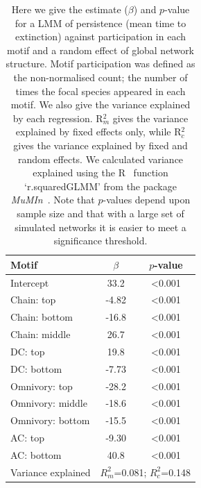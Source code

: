 \documentclass[12pt]{article}
\begin{document}
		\begin{table}[hb!]
    		\caption{Here we give the estimate ($\beta$) and $p$-value for a LMM of persistence (mean time to extinction) against participation in each motif and a random effect of global network structure. Motif participation was defined as the non-normalised count; the number of times the focal species appeared in each motif. We also give the variance explained by each regression. R$^{2}_{m}$ gives the variance explained by fixed effects only, while R$^{2}_{c}$ gives the variance explained by fixed and random effects. We calculated variance explained using the R~\citep{R} function `r.squaredGLMM' from the package \emph{MuMIn}~\citep{MuMIn}. Note that $p$-values depend upon sample size and that with a large set of simulated networks it is easier to meet a significance threshold.}
    		\label{tab:freq_positions}
    		\begin{tabular}{l | c c}
    		Motif & $\beta$ & $p$-value \\  
    		\hline
            Intercept	&	33.2	&	\textless0.001	\\
            Chain: top	&	-4.82	&	\textless0.001	\\
            Chain: bottom	&	-16.8	&	\textless0.001	\\
            Chain: middle	&	26.7	&	\textless0.001	\\
            DC: top	&	19.8	&	\textless0.001	\\
            DC: bottom	&	-7.73	&	\textless0.001	\\
            Omnivory: top	&	-28.2	&	\textless0.001	\\
            Omnivory: middle	&	-18.6	&	\textless0.001	\\
            Omnivory: bottom	&	-15.5	&	\textless0.001	\\
            AC: top	&	-9.30	&	\textless0.001	\\
            AC: bottom	&	40.8	&	\textless0.001	\\
            \hline
    		Variance explained & \multicolumn{2}{c}{$R^{2}_m$=0.081; $R^2_c$=0.148} \\
    		\hline
    		\end{tabular}
    		\end{table}
\end{document}
